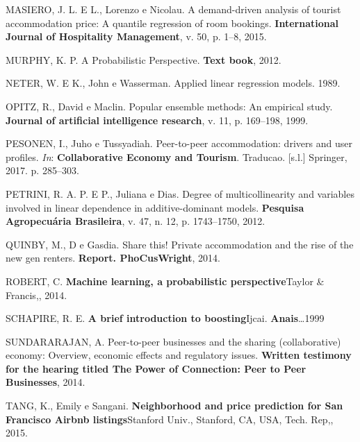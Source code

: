 \documentclass[
	12pt,				%
	a4paper,		%
	oneside,    %
	chapter=TITLE,		   %
	section=TITLE,		   %
	subsection=TITLE,	   %
	subsubsection=TITLE, %
	english,			%
	french,				%
	spanish,			%
	brazil,				%
]{abntex2}
\begin{document}
\leavevmode\hypertarget{ref-masiero2015demand}{}%
MASIERO, J. L. E L., Lorenzo e Nicolau. A demand-driven analysis of
tourist accommodation price: A quantile regression of room bookings.
\textbf{International Journal of Hospitality Management}, v. 50, p.
1--8, 2015.

\leavevmode\hypertarget{ref-murphy2012probabilistic}{}%
MURPHY, K. P. A Probabilistic Perspective. \textbf{Text book}, 2012.

\leavevmode\hypertarget{ref-neter1989applied}{}%
NETER, W. E K., John e Wasserman. Applied linear regression models.
1989.

\leavevmode\hypertarget{ref-opitz1999popular}{}%
OPITZ, R., David e Maclin. Popular ensemble methods: An empirical study.
\textbf{Journal of artificial intelligence research}, v. 11, p.
169--198, 1999.

\leavevmode\hypertarget{ref-pesonen2017peer}{}%
PESONEN, I., Juho e Tussyadiah. Peer-to-peer accommodation: drivers and
user profiles. \emph{In}: \textbf{Collaborative Economy and Tourism}.
Traducao. {[}s.l.{]} Springer, 2017. p. 285--303.

\leavevmode\hypertarget{ref-petrini2012degree}{}%
PETRINI, R. A. P. E P., Juliana e Dias. Degree of multicollinearity and
variables involved in linear dependence in additive-dominant models.
\textbf{Pesquisa Agropecuária Brasileira}, v. 47, n. 12, p. 1743--1750,
2012.

\leavevmode\hypertarget{ref-quinby2014share}{}%
QUINBY, M., D e Gasdia. Share this! Private accommodation and the rise
of the new gen renters. \textbf{Report. PhoCusWright}, 2014.

\leavevmode\hypertarget{ref-robert2014machine}{}%
ROBERT, C. \textbf{Machine learning, a probabilistic perspective}Taylor
\& Francis,, 2014.

\leavevmode\hypertarget{ref-schapire1999brief}{}%
SCHAPIRE, R. E. \textbf{A brief introduction to boosting}Ijcai.
\textbf{Anais}\ldots1999

\leavevmode\hypertarget{ref-sundararajan2014peer}{}%
SUNDARARAJAN, A. Peer-to-peer businesses and the sharing (collaborative)
economy: Overview, economic effects and regulatory issues.
\textbf{Written testimony for the hearing titled The Power of
Connection: Peer to Peer Businesses}, 2014.

\leavevmode\hypertarget{ref-tang2015neighborhood}{}%
TANG, K., Emily e Sangani. \textbf{Neighborhood and price prediction for
San Francisco Airbnb listings}Stanford Univ., Stanford, CA, USA, Tech.
Rep,, 2015.
\end{document}

